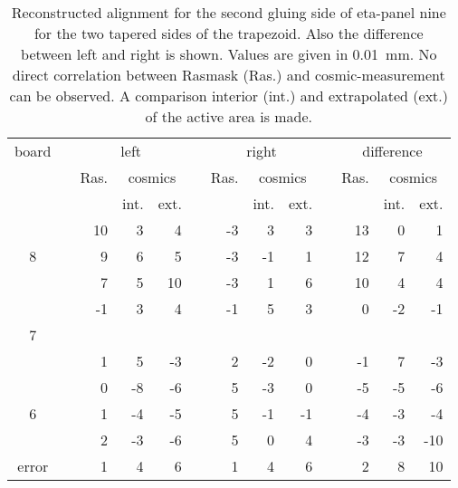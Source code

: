 \documentclass[
twoside,            %
BCOR1.4cm,          %
10pt,               %
headings=normal,    %
headsepline,        %
clearplainpage,		%
final,              %
div=14,
open=right,
bibliography=toc
]{scrreprt}
\begin{document}
\begin{table}[!h]
	\centering	
	\begin{tabular}{ccrrrcrrrcrrr}
		\hline
		\hline
		board & \hspace{1mm} & \multicolumn{3}{c}{left} & \hspace{1mm} & \multicolumn{3}{c}{right} & \hspace{1mm} & \multicolumn{3}{c}{difference}
		\\
		 & & Ras. & \multicolumn{2}{c}{cosmics} & & Ras. & \multicolumn{2}{c}{cosmics} & & Ras. & \multicolumn{2}{c}{cosmics}
		\\
	 	 & &       & int. & ext. & &      & int. & ext. & &      & int. & ext.
 		\\
		\hline
		  & &   10 &    3 &    4 & &   -3 &    3 &    3 & &   13 &    0 &    1
		\\
		8 & &    9 &    6 &    5 & &   -3 &   -1 &    1 & &   12 &    7 &    4
		\\
		  & &    7 &    5 &   10 & &   -3 &    1 &    6 & &   10 &    4 &    4
		\\
		\hline
		  & &   -1 &    3 &    4 & &   -1 &    5 &    3 & &    0 &   -2 &   -1
		\\
		7 & &      &      &      & &      &      &      & &      &      &     
		\\
		  & &    1 &    5 &   -3 & &    2 &   -2 &    0 & &   -1 &    7 &   -3
		\\
		\hline
		  & &    0 &   -8 &   -6 & &    5 &   -3 &    0 & &   -5 &   -5 &   -6
		\\
		6 & &    1 &   -4 &   -5 & &    5 &   -1 &   -1 & &   -4 &   -3 &   -4
		\\
		  & &    2 &   -3 &   -6 & &    5 &    0 &    4 & &   -3 &   -3 &  -10
 		\\
	 	\hline
	 	error & & 1 & 4 & 6 & & 1 & 4 & 6 & & 2 & 8 & 10
 		\\
	 	\hline
		\hline
	\end{tabular}
	\caption{
		Reconstructed alignment for the second gluing side of eta-panel nine for the two tapered sides of the trapezoid.
		Also the difference between left and right is shown.
		Values are given in \SI{0.01}{mm}.
		No direct correlation between Rasmask (Ras.) and cosmic-measurement can be observed.
		A comparison interior (int.) and extrapolated (ext.) of the active area is made.
	}
	\label{eta9gs2alignment}
	\vspace{-5mm}
\end{table}
\end{document}
